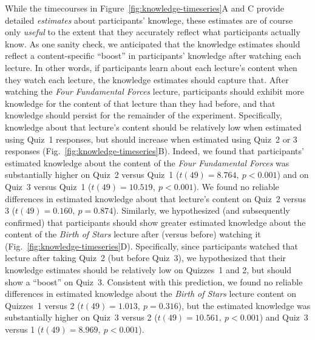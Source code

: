 \documentclass[10pt]{article}
\begin{document}
While the timecourses in
Figure~\ref{fig:knowledge-timeseries}A and C provide detailed
\textit{estimates} about participants' knowlege, these estimates are of course only
\textit{useful} to the extent that they accurately reflect what participants
actually know. As one sanity check, we anticipated that the knowledge estimates
should reflect a content-specific ``boost'' in participants' knowledge after
watching each lecture. In other words, if participants learn about each
lecture's content when they watch each lecture, the knowledge estimates should
capture that. After watching the \textit{Four Fundamental Forces} lecture,
participants should exhibit more knowledge for the content of that lecture than
they had before, and that knowledge should persist for the remainder of the
experiment. Specifically, knowledge about that lecture's content should be
relatively low when estimated using Quiz~1 responses, but should increase when
estimated using Quiz~2 or 3 responses (Fig.~\ref{fig:knowledge-timeseries}B).
Indeed, we found that participants' estimated knowledge about the content of
the \textit{Four Fundamental Forces} was substantially higher on Quiz~2 versus
Quiz~1 ($t(49) = 8.764,~p < 0.001$) and on Quiz~3 versus Quiz~1 ($t(49) =
10.519,~p < 0.001$). We found no reliable differences in estimated knowledge
about that lecture's content on Quiz~2 versus 3 ($t(49) = 0.160,~p = 0.874$).
Similarly, we hypothesized (and subsequently confirmed) that participants
should show greater estimated knowledge about the content of the \textit{Birth of
Stars} lecture after (versus before) watching it
(Fig.~\ref{fig:knowledge-timeseries}D). Specifically, since participants
watched that lecture after taking Quiz~2 (but before Quiz~3), we hypothesized
that their knowledge estimates should be relatively low on Quizzes~1 and 2, but
should show a ``boost'' on Quiz~3. Consistent with this prediction, we found no
reliable differences in estimated knowledge about the \textit{Birth of Stars}
lecture content on Quizzes~1 versus 2 ($t(49) = 1.013,~p = 0.316$), but the
estimated knowledge was substantially higher on Quiz~3 versus 2 ($t(49) =
10.561,~p < 0.001$) and Quiz~3 versus 1 ($t(49) = 8.969,~p < 0.001$).
\end{document}
